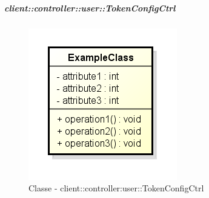 		\subparagraph{client::controller::user::TokenConfigCtrl} %
		\label{subp:client_controller_user_tokenconfigctrl}
			\begin{figure}[htbp]
				\centering
				\centerline{\includegraphics[scale=0.7]{./images/client/classes/example_class.png}}
				\caption{Classe - client::controller:user::TokenConfigCtrl}
			\end{figure}
